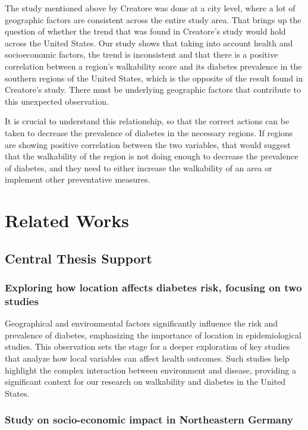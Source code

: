 \documentclass[
]{article}
\begin{document}
The study mentioned above by Creatore was done at a city level, where a
lot of geographic factors are consistent across the entire study area.
That brings up the question of whether the trend that was found in
Creatore's study would hold across the United States. Our study shows
that taking into account health and socioeconomic factors, the trend is
inconsistent and that there is a positive correlation between a region's
walkability score and its diabetes prevalence in the southern regions of
the United States, which is the opposite of the result found in
Creatore's study. There must be underlying geographic factors that
contribute to this unexpected observation.

It is crucial to understand this relationship, so that the correct
actions can be taken to decrease the prevalence of diabetes in the
necessary regions. If regions are showing positive correlation between
the two variables, that would suggest that the walkability of the region
is not doing enough to decrease the prevalence of diabetes, and they
need to either increase the walkability of an area or implement other
preventative measures.

\section{Related Works}\label{related-works}

\subsection{Central Thesis Support}\label{central-thesis-support}

\subsubsection{Exploring how location affects diabetes risk, focusing on
two
studies}\label{exploring-how-location-affects-diabetes-risk-focusing-on-two-studies}

Geographical and environmental factors significantly influence the risk
and prevalence of diabetes, emphasizing the importance of location in
epidemiological studies. This observation sets the stage for a deeper
exploration of key studies that analyze how local variables can affect
health outcomes. Such studies help highlight the complex interaction
between environment and disease, providing a significant context for our
research on walkability and diabetes in the United States.

\subsubsection{Study on socio-economic impact in Northeastern
Germany}\label{study-on-socio-economic-impact-in-northeastern-germany}
\end{document}
